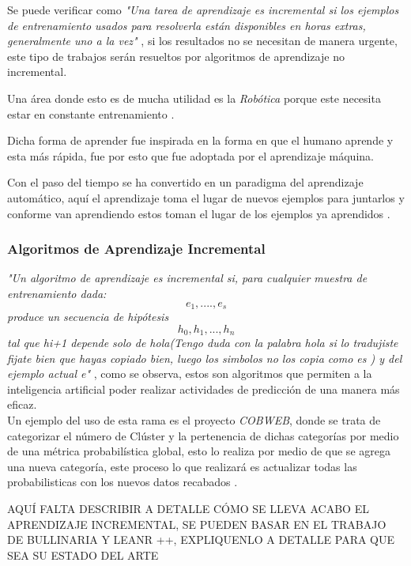         Se puede verificar como \textit{"Una tarea de aprendizaje es incremental si los ejemplos de entrenamiento usados para 
        resolverla están disponibles en horas extras, generalmente uno a la vez"} \cite{GiraudCarrier2000}, si los resultados no se 
        necesitan de manera urgente, este tipo de trabajos serán resueltos por algoritmos de aprendizaje no incremental. 

        Una área donde esto es de mucha utilidad es la \textit{Rob\'otica} porque este necesita estar en constante entrenamiento \cite{GiraudCarrier2000}.

        Dicha forma de aprender fue inspirada en la forma en que el humano aprende y esta más rápida, fue por esto que fue adoptada 
        por el aprendizaje m\'aquina.

        Con el paso del tiempo se ha convertido en un paradigma del aprendizaje automático, aquí el aprendizaje toma el lugar de nuevos ejemplos para juntarlos 
        y conforme van aprendiendo estos toman el lugar de los ejemplos ya aprendidos \cite{liu2015}.

        \subsubsection{Algoritmos de Aprendizaje Incremental}
            \textit{"Un algoritmo de aprendizaje es incremental si,
            para cualquier muestra de entrenamiento dada:
            \begin{equation}
                e_{1} , .... , e_{s}
			\end{equation}
            produce un secuencia de hipótesis 
            \begin{equation}
                h_{0} , h_{1}, . . . , h_{n} 
            \end{equation}
            tal que hi+1 depende solo de hola(Tengo duda con la palabra hola si lo tradujiste fijate bien que hayas copiado bien, luego los simbolos no los copia como es ) y del ejemplo actual e"} \cite{GiraudCarrier2000}, como se 
            observa, estos son algoritmos que permiten a la inteligencia artificial poder realizar actividades de predicci\'on 
            de una manera m\'as eficaz.\\
            Un ejemplo del uso de esta rama es el proyecto \textit{COBWEB}, donde se trata de categorizar el n\'umero de Cl\'uster y la pertenencia 
            de dichas categor\'ias por medio de una m\'etrica probabil\'istica global, esto lo realiza por medio de que se agrega 
            una nueva categor\'ia, este proceso lo que realizar\'a es actualizar todas las probabilisticas con los nuevos datos recabados \cite{fisher1987}.


AQUÍ FALTA DESCRIBIR A DETALLE CÓMO SE LLEVA ACABO EL APRENDIZAJE INCREMENTAL, SE PUEDEN BASAR EN EL TRABAJO DE BULLINARIA Y LEANR ++, EXPLIQUENLO A DETALLE PARA QUE SEA SU ESTADO DEL ARTE

